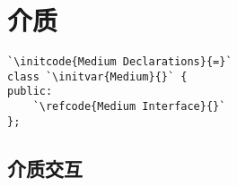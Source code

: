 \section{介质}\label{sec:介质}

\begin{lstlisting}
`\initcode{Medium Declarations}{=}`
class `\initvar{Medium}{}` {
public:
    `\refcode{Medium Interface}{}`
};
\end{lstlisting}

\subsection{介质交互}\label{sub:介质交互}